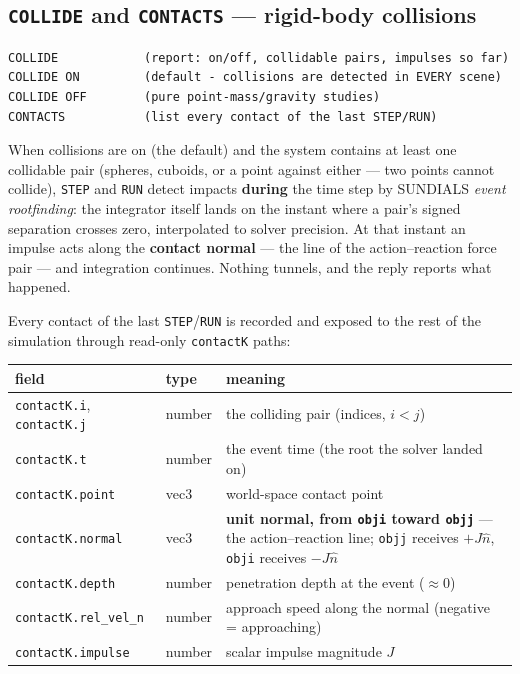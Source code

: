 \documentclass[11pt]{article}
\newcommand{\kw}[1]{\texttt{\uppercase{#1}}}
\newcommand{\code}[1]{\texttt{#1}}
\begin{document}
\subsection{\kw{collide} and \kw{contacts} --- rigid-body collisions}
\label{sec:collide}

\begin{lstlisting}
COLLIDE            (report: on/off, collidable pairs, impulses so far)
COLLIDE ON         (default - collisions are detected in EVERY scene)
COLLIDE OFF        (pure point-mass/gravity studies)
CONTACTS           (list every contact of the last STEP/RUN)
\end{lstlisting}

When collisions are on (the default) and the system contains at least
one collidable pair (spheres, cuboids, or a point against either ---
two points cannot collide), \kw{step} and \kw{run} detect impacts
\textbf{during} the time step by SUNDIALS \emph{event rootfinding}: the
integrator itself lands on the instant where a pair's signed separation
crosses zero, interpolated to solver precision. At that instant an
impulse acts along the \textbf{contact normal} --- the line of the
action--reaction force pair --- and integration continues. Nothing
tunnels, and the reply reports what happened.

Every contact of the last \kw{step}/\kw{run} is recorded and exposed to
the rest of the simulation through read-only \code{contactK} paths:

\begin{center}\small
\begin{tabular}{llp{8.0cm}}
\textbf{field} & \textbf{type} & \textbf{meaning}\\\hline
\code{contactK.i}, \code{contactK.j} & number & the colliding pair (indices, $i < j$)\\
\code{contactK.t} & number & the event time (the root the solver landed on)\\
\code{contactK.point} & vec3 & world-space contact point\\
\code{contactK.normal} & vec3 & \textbf{unit normal, from \code{obji} toward \code{objj}} --- the action--reaction line; \code{objj} receives $+J\hat n$, \code{obji} receives $-J\hat n$\\
\code{contactK.depth} & number & penetration depth at the event ($\approx 0$)\\
\code{contactK.rel\_vel\_n} & number & approach speed along the normal (negative = approaching)\\
\code{contactK.impulse} & number & scalar impulse magnitude $J$\\
\end{tabular}
\end{center}
\end{document}
